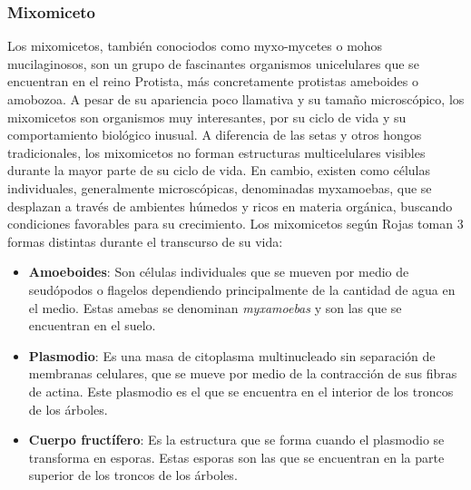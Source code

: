 \subsubsection{Mixomiceto}
    Los mixomicetos, tambi\'en conociodos como myxo-mycetes o mohos mucilaginosos, son 
        un grupo de fascinantes organismos unicelulares que se encuentran en el reino Protista, m\'as concretamente
        protistas ameboides o amobozoa.
        A pesar de su apariencia poco llamativa y su tama\~no microsc\'opico,
        los mixomicetos son organismos muy interesantes, por su ciclo de vida y su comportamiento
        biol\'ogico inusual.
    \vskip 0.5cm
    A diferencia de las setas y otros hongos tradicionales, los mixomicetos no forman estructuras 
        multicelulares visibles durante la mayor parte de su ciclo de vida. En cambio, existen como 
        c\'elulas individuales, generalmente microsc\'opicas, denominadas myxamoebas, que se desplazan a
        trav\'es de ambientes h\'umedos y ricos en materia org\'anica, buscando condiciones favorables para su crecimiento.\cite{Rojas2017}
    \vskip 0.5cm
    Los mixomicetos seg\'un Rojas \cite{Rojas2017} toman 3 formas distintas durante el transcurso de su vida: 
    \begin{itemize}
        \item \textbf{Amoeboides}: Son c\'elulas individuales que se mueven por medio de 
            seud\'opodos o flagelos dependiendo principalmente de la cantidad de agua en el medio.
            Estas amebas se denominan \textit{myxamoebas} y son las que se encuentran en el suelo.
        \item \textbf{Plasmodio}: Es una masa de citoplasma multinucleado sin separaci\'on de 
            membranas celulares, que se mueve por medio de la contracci\'on de sus fibras de actina.
            Este plasmodio es el que se encuentra en el interior de los troncos de los \'arboles.
        \item \textbf{Cuerpo fruct\'ifero}: Es la estructura que se forma cuando el plasmodio 
            se transforma en esporas. Estas esporas son las que se encuentran en la parte superior 
            de los troncos de los \'arboles.
    \end{itemize}
    \vskip 0.5cm
